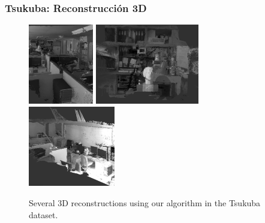 \documentclass[compress]{beamer}
\begin{document}
\begin{frame}
	\frametitle{Tsukuba: Reconstrucción 3D}
\begin{figure}[!htb]
	\centering
	{\includegraphics[width=0.32\columnwidth, height=3.5cm]{./images/tsukuba_3d_1}%
		\label{tsukuba_3d_1}}
	\hfil
	{\includegraphics[width=0.32\columnwidth, height=3.5cm]{./images/tsukuba_3d_2}%
		\label{tsukuba_3d_2}}
	\hfil
	{\includegraphics[width=0.32\columnwidth, height=3.5cm]{./images/tsukuba_3d_3}%
		\label{tsukuba_3d_3}}
	\hfil
	\caption{Several 3D reconstructions using our algorithm in the Tsukuba dataset.}
	\label{fig:tsukuba_reconstructions}
\end{figure}
\end{frame}
\end{document}
